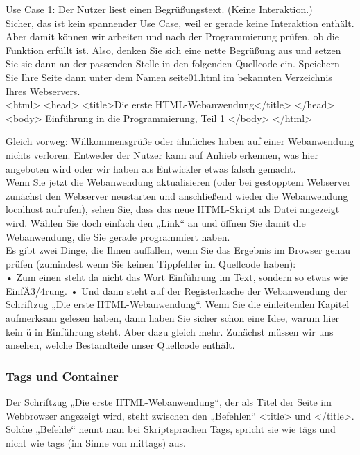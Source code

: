 Use Case 1: Der Nutzer liest einen Begrüßungstext. (Keine Interaktion.)\\

Sicher, das ist kein spannender Use Case, weil er gerade keine Interaktion enthält. Aber damit können wir arbeiten und nach der Programmierung prüfen, ob die Funktion erfüllt ist. Also, denken Sie sich eine nette Begrüßung aus und setzen Sie sie dann an der passenden Stelle in den folgenden Quellcode ein. Speichern Sie Ihre Seite dann unter dem Namen seite01.html im bekannten Verzeichnis Ihres Webservers.\\

<html>
<head>
<title>Die erste HTML-Webanwendung</title>
</head>
<body>
Einführung in die Programmierung, Teil 1
</body>
</html>

Gleich vorweg: Willkommensgrüße oder ähnliches haben auf einer Webanwendung nichts verloren. Entweder der Nutzer kann auf Anhieb erkennen, was hier angeboten wird oder wir haben als Entwickler etwas falsch gemacht.\\

Wenn Sie jetzt die Webanwendung aktualisieren (oder bei gestopptem Webserver zunächst den Webserver neustarten und anschließend wieder die Webanwendung localhost aufrufen), sehen Sie, dass das neue HTML-Skript als Datei angezeigt wird. Wählen Sie doch einfach den „Link“ an und öffnen Sie damit die Webanwendung, die Sie gerade programmiert haben.\\

Es gibt zwei Dinge, die Ihnen auffallen, wenn Sie das Ergebnis im Browser genau prüfen (zumindest wenn Sie keinen Tippfehler im Quellcode haben): \\

•	Zum einen steht da nicht das Wort Einführung im Text, sondern so etwas wie EinfÄ3/4rung.
•	Und dann steht auf der Registerlasche der Webanwendung der Schriftzug „Die erste HTML-Webanwendung“.
Wenn Sie die einleitenden Kapitel aufmerksam gelesen haben, dann haben Sie sicher schon eine Idee, warum hier kein ü in Einführung steht. Aber dazu gleich mehr. Zunächst müssen wir uns ansehen, welche Bestandteile unser Quellcode enthält.

\subsubsection{Tags und Container}

Der Schriftzug „Die erste HTML-Webanwendung“, der als Titel der Seite im Webbrowser angezeigt wird, steht zwischen den „Befehlen“ <title> und </title>. Solche „Befehle“ nennt man bei Skriptsprachen Tags, spricht sie wie tägs und nicht wie tags (im Sinne von mittags) aus.\\

